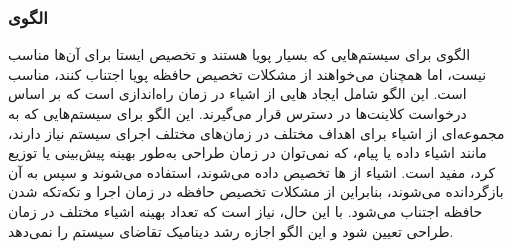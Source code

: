 \subsubsection{الگوی }
\label{memPoolAllocSec}
\begin{RTL}
الگوی  \cite{ref4}
برای سیستم‌هایی که بسیار پویا هستند
و تخصیص ایستا برای آن‌ها مناسب نیست، اما همچنان می‌خواهند از
مشکلات تخصیص حافظه پویا اجتناب کنند، مناسب است.
این الگو شامل ایجاد هایی از اشیاء در زمان راه‌اندازی است که
بر اساس درخواست کلاینت‌ها در دسترس قرار می‌گیرند.
این الگو برای سیستم‌هایی که به مجموعه‌ای از اشیاء برای اهداف مختلف
در زمان‌های مختلف اجرای سیستم نیاز دارند، مانند اشیاء داده یا پیام،
که نمی‌توان در زمان طراحی به‌طور بهینه پیش‌بینی یا توزیع کرد، مفید است.
اشیاء از ها تخصیص داده می‌شوند، استفاده می‌شوند
و سپس به آن بازگردانده می‌شوند، بنابراین از مشکلات تخصیص حافظه
در زمان اجرا و تکه‌تکه شدن حافظه اجتناب می‌شود.
با این حال، نیاز است که تعداد بهینه اشیاء مختلف در
زمان طراحی تعیین شود و این الگو اجازه رشد دینامیک تقاضای سیستم را نمی‌دهد.
\end{RTL}